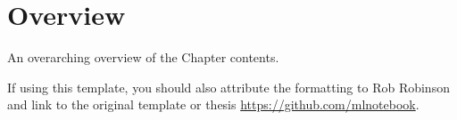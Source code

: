 \section{Overview}
\label{sec:2-overview}
\glsresetall

An overarching overview of the Chapter contents.

If using this template, you should also attribute the formatting to Rob Robinson \parencite{robinson2020thesis} and link to the original template or thesis \url{https://github.com/mlnotebook}.